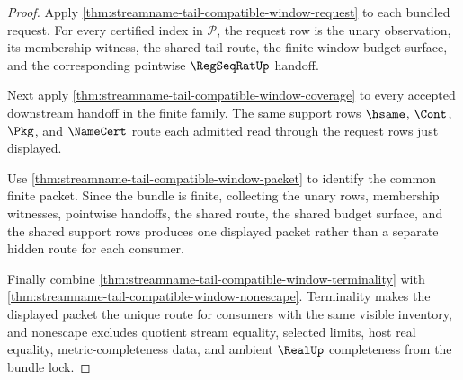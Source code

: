 \begin{proof}
Apply \autoref{thm:streamname-tail-compatible-window-request} to each
bundled request. For every certified index in $\mathcal P$, the request row
is the unary observation, its membership witness, the shared tail route, the
finite-window budget surface, and the corresponding pointwise
$\RegSeqRatUp$ handoff.

Next apply \autoref{thm:streamname-tail-compatible-window-coverage} to every
accepted downstream handoff in the finite family. The same support rows
$\hsame$, $\Cont$, $\Pkg$, and $\NameCert$ route each admitted read through
the request rows just displayed.

Use \autoref{thm:streamname-tail-compatible-window-packet} to identify the
common finite packet. Since the bundle is finite, collecting the unary rows,
membership witnesses, pointwise handoffs, the shared route, the shared
budget surface, and the shared support rows produces one displayed packet
rather than a separate hidden route for each consumer.

Finally combine
\autoref{thm:streamname-tail-compatible-window-terminality} with
\autoref{thm:streamname-tail-compatible-window-nonescape}. Terminality makes
the displayed packet the unique route for consumers with the same visible
inventory, and nonescape excludes quotient stream equality, selected limits,
host real equality, metric-completeness data, and ambient $\RealUp$
completeness from the bundle lock.
\end{proof}

